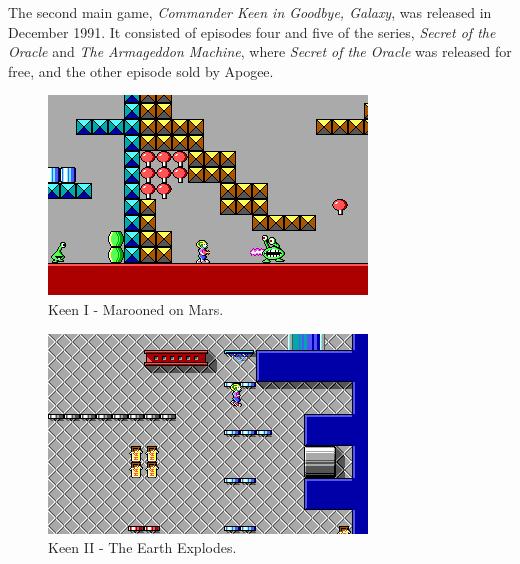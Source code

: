 \documentclass[book.tex]{subfiles}
\begin{document}
\par
The second main game, \textit{Commander Keen in Goodbye, Galaxy}, was released in December 1991. It consisted of episodes four and five of the series, \textit{Secret of the Oracle} and \textit{The Armageddon Machine}, where \textit{Secret of the Oracle} was released for free, and the other episode sold by Apogee.\\

\begin{figure}[H]
  \centering
  \includegraphics[width=.95\textwidth]{screenshots_300dpi/Keen_Marooned_on_Mars_gameplay.png}
  \caption*{Keen I - Marooned on Mars.}
\label{fig:keen_1}
\end{figure}

\begin{figure}[H]
  \centering
  \includegraphics[width=.95\textwidth]{screenshots_300dpi/keen1_2.png}
  \caption*{Keen II - The Earth Explodes.}
\label{fig:keen_1}
\end{figure}
\end{document}
